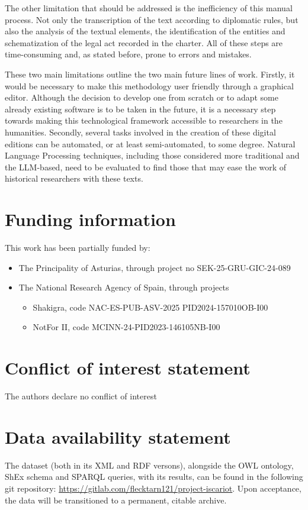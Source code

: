 \documentclass{article}
\begin{document}
The other limitation that should be addressed is the inefficiency of this manual process.
Not only the transcription of the text according to diplomatic rules, but also the analysis of the textual elements,  the identification of the entities and schematization of the legal act recorded in the charter.
All of these steps are time-consuming and, as stated before, prone to errors and mistakes.

These two main limitations outline the two main future lines of work.
Firstly, it would be necessary to make this methodology user friendly through a graphical editor.
Although the decision to develop one from scratch or to adapt some already existing software is to be taken in the future, it is a necessary step towards making this technological framework accessible to researchers in the humanities.
Secondly, several tasks involved in the creation of these digital editions can be automated, or at least semi-automated, to some degree.
Natural Language Processing techniques, including those considered more traditional and the LLM-based, need to be evaluated to find those that may ease the work of historical researchers with these texts.

\section*{Funding information}
This work has been partially funded by:
\begin{itemize}
    \item The Principality of Asturias, through project no SEK-25-GRU-GIC-24-089
    \item The National Research Agency of Spain, through projects 
    \begin{itemize}
        \item Shakigra, code NAC-ES-PUB-ASV-2025 PID2024-157010OB-I00
        \item NotFor II, code MCINN-24-PID2023-146105NB-I00
    \end{itemize}
\end{itemize}
  
\section*{Conflict of interest statement}
The authors declare no conflict of interest

\section*{Data availability statement}
The dataset (both in its XML and RDF versons), alongside the OWL ontology, ShEx schema and SPARQL queries, with its results, can be found in the following git repository: \url{https://gitlab.com/flecktarn121/project-iscariot}. 
Upon acceptance, the data will be transitioned to a permanent, citable archive.
\end{document}
